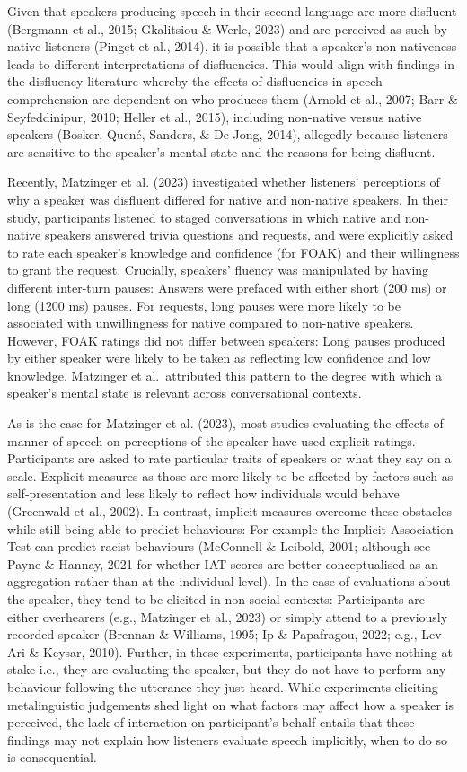 \documentclass[
  man,floatsintext]{apa7}
\begin{document}
Given that speakers producing speech in their second language are more disfluent (Bergmann et al., 2015; Gkalitsiou \& Werle, 2023) and are perceived as such by native listeners (Pinget et al., 2014), it is possible that a speaker's non-nativeness leads to different interpretations of disfluencies. This would align with findings in the disfluency literature whereby the effects of disfluencies in speech comprehension are dependent on who produces them (Arnold et al., 2007; Barr \& Seyfeddinipur, 2010; Heller et al., 2015), including non-native versus native speakers (Bosker, Quené, Sanders, \& De Jong, 2014), allegedly because listeners are sensitive to the speaker's mental state and the reasons for being disfluent.

Recently, Matzinger et al. (2023) investigated whether listeners' perceptions of why a speaker was disfluent differed for native and non-native speakers. In their study, participants listened to staged conversations in which native and non-native speakers answered trivia questions and requests, and were explicitly asked to rate each speaker's knowledge and confidence (for FOAK) and their willingness to grant the request. Crucially, speakers' fluency was manipulated by having different inter-turn pauses: Answers were prefaced with either short (200 ms) or long (1200 ms) pauses. For requests, long pauses were more likely to be associated with unwillingness for native compared to non-native speakers. However, FOAK ratings did not differ between speakers: Long pauses produced by either speaker were likely to be taken as reflecting low confidence and low knowledge. Matzinger et al.~attributed this pattern to the degree with which a speaker's mental state is relevant across conversational contexts.

As is the case for Matzinger et al. (2023), most studies evaluating the effects of manner of speech on perceptions of the speaker have used explicit ratings. Participants are asked to rate particular traits of speakers or what they say on a scale. Explicit measures as those are more likely to be affected by factors such as self-presentation and less likely to reflect how individuals would behave (Greenwald et al., 2002). In contrast, implicit measures overcome these obstacles while still being able to predict behaviours: For example the Implicit Association Test can predict racist behaviours (McConnell \& Leibold, 2001; although see Payne \& Hannay, 2021 for whether IAT scores are better conceptualised as an aggregation rather than at the individual level). In the case of evaluations about the speaker, they tend to be elicited in non-social contexts: Participants are either overhearers (e.g., Matzinger et al., 2023) or simply attend to a previously recorded speaker (Brennan \& Williams, 1995; Ip \& Papafragou, 2022; e.g., Lev-Ari \& Keysar, 2010). Further, in these experiments, participants have nothing at stake i.e., they are evaluating the speaker, but they do not have to perform any behaviour following the utterance they just heard. While experiments eliciting metalinguistic judgements shed light on what factors may affect how a speaker is perceived, the lack of interaction on participant's behalf entails that these findings may not explain how listeners evaluate speech implicitly, when to do so is consequential.
\end{document}
